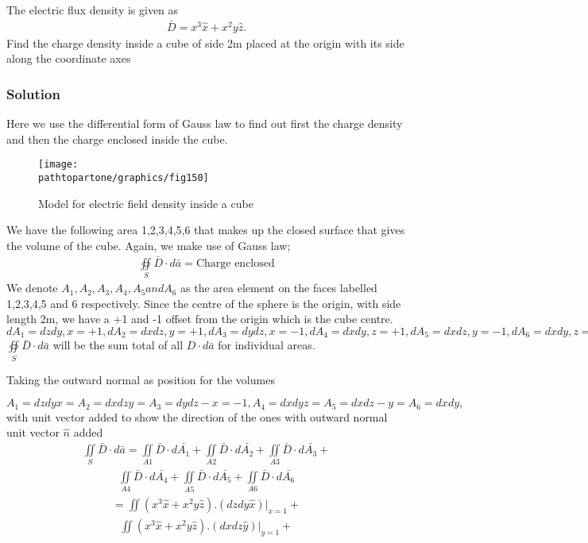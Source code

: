 \begin{exmp}
	The electric flux density is given as
	\begin{align*}
			\bar{D}=x^{3}\hat{x} + x^{2}y\hat{z}.
		\end{align*}
	Find the charge density inside a cube of side 2m placed at the origin with its side along the coordinate axes
	
	\subsubsection*{Solution}
	
	Here we use the differential form of Gauss law to find out first the charge density and then the charge enclosed inside the cube.\\
	\begin{figure}[h]
			\centering
			\texttt{[image: \\pathtopartone/graphics/fig150]}
			\caption{Model for electric field density inside a cube}
		\end{figure}
	
	We have the following area 1,2,3,4,5,6 that makes up the closed surface that gives the volume of the cube. Again, we make use of Gauss law;
	\begin{align*}
			\oiint\limits_S\bar{D}\cdot d\bar{a} = \text{Charge enclosed}
		\end{align*}
	We denote $A_1,A_2,A_3,A_4,A_5 and A_6$ as the area element on the faces labelled 1,2,3,4,5 and 6 respectively. Since the centre of the sphere is the origin, with side length 2m, we have a +1 and -1 offset from the origin which is the cube centre.\\
	
	$dA_1 = dzdy, x= +1, dA_2 = dxdz, y= +1, dA_3 = dydz, x= -1, dA_4 = dxdy, z= +1, dA_5 = dxdz, y= -1, dA_6 = dxdy, z= -1 $\\
	
	$\oiint\limits_S\bar{D}\cdot d\bar{a}$ will be the sum total of all ${D}\cdot d\bar{a}$ for individual areas.
	
	Taking the outward normal as position for the volumes
	
	$A_1 = dzdyx=  A_2 = dxdzy= A_3 = dydz-x= -1, A_4 = dxdyz= A_5 = dxdz-y= A_6 = dxdy, $\\ with unit vector added to show the direction of the ones with outward normal unit vector $\hat{n}$ added
	\begin{align*}
			\iint\limits_S\bar{D}\cdot d\bar{a} = \iint\limits_{A1}\bar{D}\cdot d\bar{A_1} +\iint\limits_{A2}\bar{D}\cdot d\bar{A_2}+ \iint\limits_{A3}\bar{D}\cdot d\bar{A_3}+ 
		\end{align*}
	\begin{align*}
			\iint\limits_{A4}\bar{D}\cdot d\bar{A_4}+ \iint\limits_{A5}\bar{D}\cdot d\bar{A_5}+ \iint\limits_{A6}\bar{D}\cdot d\bar{A_6}   
		\end{align*}
	\begin{align*}
			=\iint\limits(x^3 \hat{x}+ x^2y\hat{z}).(dzdy\hat{x})|_{x=1}+
		\end{align*}
	\begin{align*}
			\iint\limits(x^3 \hat{x}+ x^2y\hat{z}).(dxdz\hat{y})|_{y=1}+
		\end{align*}
	

\end{exmp}

